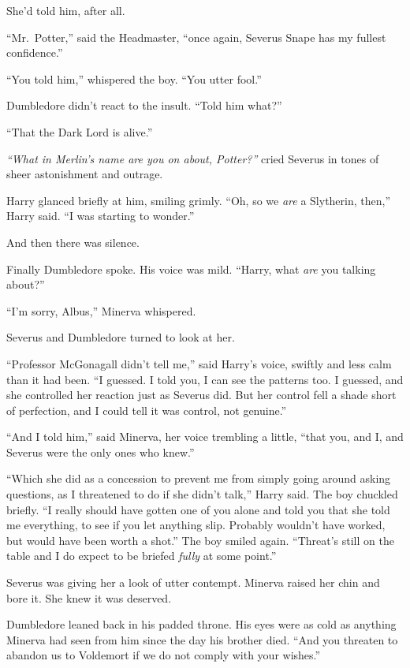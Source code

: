 She'd told him, after all.

``Mr.~Potter,'' said the Headmaster, ``once again, Severus Snape has my
fullest confidence.''

``You told him,'' whispered the boy. ``You utter fool.''

Dumbledore didn't react to the insult. ``Told him what?''

``That the Dark Lord is alive.''

\emph{``What in Merlin's name are you on about, Potter?''} cried Severus
in tones of sheer astonishment and outrage.

Harry glanced briefly at him, smiling grimly. ``Oh, so we \emph{are} a
Slytherin, then,'' Harry said. ``I was starting to wonder.''

And then there was silence.

Finally Dumbledore spoke. His voice was mild. ``Harry, what \emph{are}
you talking about?''

``I'm sorry, Albus,'' Minerva whispered.

Severus and Dumbledore turned to look at her.

``Professor McGonagall didn't tell me,'' said Harry's voice, swiftly and
less calm than it had been. ``I guessed. I told you, I can see the
patterns too. I guessed, and she controlled her reaction just as Severus
did. But her control fell a shade short of perfection, and I could tell
it was control, not genuine.''

``And I told him,'' said Minerva, her voice trembling a little, ``that
you, and I, and Severus were the only ones who knew.''

``Which she did as a concession to prevent me from simply going around
asking questions, as I threatened to do if she didn't talk,'' Harry
said. The boy chuckled briefly. ``I really should have gotten one of you
alone and told you that she told me everything, to see if you let
anything slip. Probably wouldn't have worked, but would have been worth
a shot.'' The boy smiled again. ``Threat's still on the table and I do
expect to be briefed \emph{fully} at some point.''

Severus was giving her a look of utter contempt. Minerva raised her chin
and bore it. She knew it was deserved.

Dumbledore leaned back in his padded throne. His eyes were as cold as
anything Minerva had seen from him since the day his brother died. ``And
you threaten to abandon us to Voldemort if we do not comply with your
wishes.''

